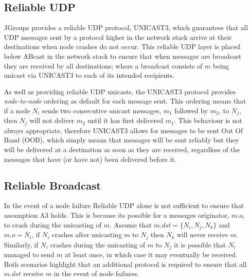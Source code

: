 	\subsection{Reliable UDP}\label{ssec:reliable_udp}
	JGroups provides a reliable UDP protocol, \textsf{UNICAST3}, which guarantees that all UDP messages sent by a protocol higher in the network stack arrive at their destinations when node crashes do not occur.  This reliable UDP layer is placed below \textsf{ABcast} in the network stack to ensure that when messages are broadcast they are received by all destinations; where a broadcast consists of $m$ being unicast via \textsf{UNICAST3} to each of its intended recipients.  
	
	As well as providing reliable UDP unicasts, the \textsf{UNICAST3} protocol provides \emph{node-to-node} ordering as default for each message sent.  This ordering means that if a node $N_i$ sends two consecutive unicast messages, $m_1$ followed by $m_2$, to $N_j$, then $N_j$ will not deliver $m_2$ until it has first delivered $m_1$.  This behaviour is not always appropriate, therefore \textsf{UNICAST3} allows for messages to be sent Out Of Band (OOB), which simply means that messages will be sent reliably but they will be delivered at a destination as soon as they are received, regardless of the messages that have (or have not) been delivered before it.  
	
	\subsection{Reliable Broadcast}\label{ssec:rbcast}
    In the event of a node failure Reliable UDP alone is not sufficient to ensure that assumption A3 holds.  This is because its possible for a messages originator, $m.o$, to crash during the unicasting of $m$.  Assume that $m.dst = \{N_i, N_j, N_k\}$ and $m.o = N_i$, if $N_i$ crashes after unicasting $m$ to $N_j$ then $N_k$ will never receive $m$.  Similarly, if $N_i$ crashes during the unicasting of $m$ to $N_j$ it is possible that $N_i$ managed to send $m$ at least once, in which case it may eventually be received.  Both scenarios highlight that an additional protocol is required to ensure that all $m.dst$ receive $m$ in the event of node failures.  
    
